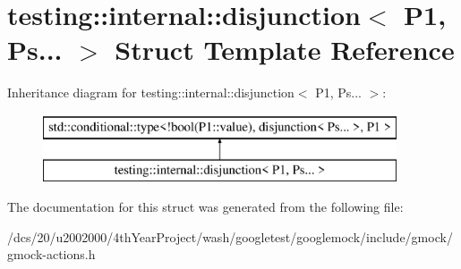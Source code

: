 \hypertarget{structtesting_1_1internal_1_1disjunction_3_01P1_00_01Ps_8_8_8_01_4}{}\section{testing\+:\+:internal\+:\+:disjunction$<$ P1, Ps... $>$ Struct Template Reference}
\label{structtesting_1_1internal_1_1disjunction_3_01P1_00_01Ps_8_8_8_01_4}
Inheritance diagram for testing\+:\+:internal\+:\+:disjunction$<$ P1, Ps... $>$\+:\begin{figure}[H]
\begin{center}
\leavevmode
\includegraphics[height=2.000000cm]{structtesting_1_1internal_1_1disjunction_3_01P1_00_01Ps_8_8_8_01_4}
\end{center}
\end{figure}


The documentation for this struct was generated from the following file\+:\begin{DoxyCompactItemize}
\item 
/dcs/20/u2002000/4th\+Year\+Project/wash/googletest/googlemock/include/gmock/gmock-\/actions.\+h\end{DoxyCompactItemize}
